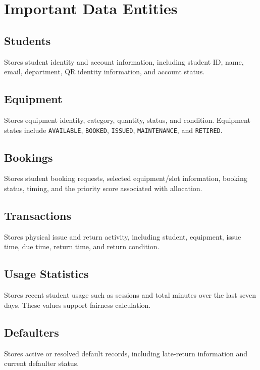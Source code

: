 \documentclass[12pt,a4paper,oneside]{report}
\begin{document}
\section{Important Data Entities}

\subsection{Students}

Stores student identity and account information, including student ID, name, email, department, QR identity information, and account status.

\subsection{Equipment}

Stores equipment identity, category, quantity, status, and condition. Equipment states include \texttt{AVAILABLE}, \texttt{BOOKED}, \texttt{ISSUED}, \texttt{MAINTENANCE}, and \texttt{RETIRED}.

\subsection{Bookings}

Stores student booking requests, selected equipment/slot information, booking status, timing, and the priority score associated with allocation.

\subsection{Transactions}

Stores physical issue and return activity, including student, equipment, issue time, due time, return time, and return condition.

\subsection{Usage Statistics}

Stores recent student usage such as sessions and total minutes over the last seven days. These values support fairness calculation.

\subsection{Defaulters}

Stores active or resolved default records, including late-return information and current defaulter status.
\end{document}
